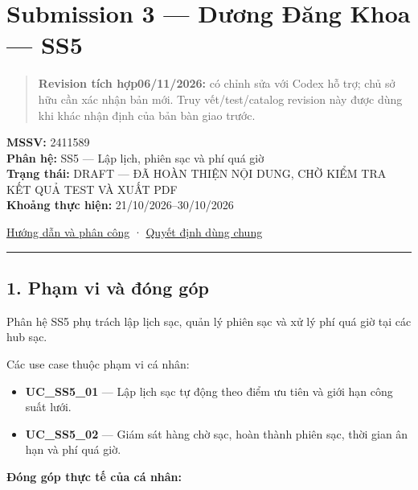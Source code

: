 \documentclass[11pt,a4paper]{article}
\providecommand{\tightlist}{%
  \setlength{\itemsep}{0pt}\setlength{\parskip}{0pt}}
\begin{document}
\setcounter{page}{1}
\tableofcontents
\newpage

\hypertarget{submission-3-dux1b0ux1a1ng-ux111ux103ng-khoa-ss5}{%
\section{Submission 3 --- Dương Đăng Khoa ---
SS5}\label{submission-3-dux1b0ux1a1ng-ux111ux103ng-khoa-ss5}}

\begin{quote}
\textbf{Revision tích hợp06/11/2026:} có chỉnh sửa với Codex hỗ trợ; chủ
sở hữu cần xác nhận bản mới. Truy vết/test/catalog revision này được
dùng khi khác nhận định của bản bàn giao trước.
\end{quote}

\textbf{MSSV:} 2411589\\
\textbf{Phân hệ:} SS5 --- Lập lịch, phiên sạc và phí quá giờ\\
\textbf{Trạng thái:} DRAFT --- ĐÃ HOÀN THIỆN NỘI DUNG, CHỜ KIỂM TRA KẾT
QUẢ TEST VÀ XUẤT PDF\\
\textbf{Khoảng thực hiện:} 21/10/2026--30/10/2026

\href{../../../../GUIDANCE_FOR_SUB_3.md}{Hướng dẫn và phân công} ·
\href{../shared/shared_contracts.md}{Quyết định dùng chung}

\begin{center}\rule{0.5\linewidth}{0.5pt}\end{center}

\hypertarget{phux1ea1m-vi-vuxe0-ux111uxf3ng-guxf3p}{%
\subsection{1. Phạm vi và đóng
góp}\label{phux1ea1m-vi-vuxe0-ux111uxf3ng-guxf3p}}

Phân hệ SS5 phụ trách lập lịch sạc, quản lý phiên sạc và xử lý phí quá
giờ tại các hub sạc.

Các use case thuộc phạm vi cá nhân:

\begin{itemize}
\tightlist
\item
  \textbf{UC\_SS5\_01} --- Lập lịch sạc tự động theo điểm ưu tiên và
  giới hạn công suất lưới.
\item
  \textbf{UC\_SS5\_02} --- Giám sát hàng chờ sạc, hoàn thành phiên sạc,
  thời gian ân hạn và phí quá giờ.
\end{itemize}

\textbf{Đóng góp thực tế của cá nhân:}
\end{document}
